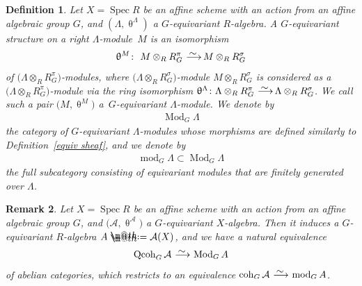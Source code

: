 \documentclass[pdftex]{sigma}%
\makeatletter
\newtheorem{dfn}{Definition}[section]
\newtheorem{rem}[dfn]{Remark}
\newcommand*{\defeq}{\mathrel{\rlap{%
 \raisebox{0.3ex}{$\m@th\cdot$}}%
 \raisebox{-0.3ex}{$\m@th\cdot$}}%
 =}
\numberwithin{equation}{section}
\newcommand{\Spec}{\operatorname{Spec}}
\newcommand{\coh}{\operatorname{coh}}
\newcommand{\Qcoh}{\operatorname{Qcoh}}
\newcommand{\Mod}{\operatorname{Mod}}
\newcommand{\fmod}{\operatorname{mod}}
\newcommand{\cA}{\mathcal{A}}
\newcommand{\simto}{\,\,\,\,\raisebox{4pt}{$\sim$}{\kern -1.1em \longrightarrow}\,}
\makeatother
\begin{document}
\begin{dfn}%
Let $X=\Spec R$ be an affine scheme with an action from an affine algebraic group $G$, and $(\Lambda,\uptheta^{\Lambda})$ a $G$-equivariant $R$-algebra. A {\it $G$-equivariant structure} on a right $\Lambda$-module~$M$ is an isomorphism
\begin{gather*}
\uptheta^M\colon\ M\otimes_RR_G^{\pi}\simto M\otimes_RR_G^{\sigma}
\end{gather*}
of $\big(\Lambda\otimes_RR_G^{\pi}\big)$-modules, where $\big(\Lambda\otimes_RR_G^{\sigma}\big)$-module $M\otimes_RR_G^{\sigma}$ is considered as a $\big(\Lambda\otimes_RR_G^{\pi}\big)$-mo\-dule via the ring isomorphism $\uptheta^{\Lambda}\colon \Lambda\otimes_RR_G^{\pi}\simto\Lambda\otimes_RR_G^{\sigma}$. We call such a pair $\big(M,\uptheta^M\big)$ a~{\it $G$-equivariant $\Lambda$-module}. We denote by
\begin{gather*}
\Mod_G\Lambda
\end{gather*}
the category of $G$-equivariant $\Lambda$-modules whose morphisms are defined similarly to Definition~\ref{equiv sheaf}, and we denote by
\begin{gather*}
\fmod_G\Lambda\subset \Mod_G\Lambda
\end{gather*}
the full subcategory consisting of equivariant modules that are finitely generated over $\Lambda$.
\end{dfn}

\begin{rem}
Let $X=\Spec R$ be an affine scheme with an action from an affine algebraic group $G$, and $\big(\cA,\uptheta^{\cA}\big)$ a $G$-equivariant $X$-algebra. Then it induces a $G$-equivariant $R$-algebra $A\defeq\cA(X)$, and we have a natural equivalence
\begin{gather*}
\Qcoh_G\cA\simto\Mod_GA
\end{gather*}
of abelian categories, which restricts to an equivalence $\coh_G\cA\simto\fmod_GA$.
\end{rem}
\vspace{1mm}
\end{document}
